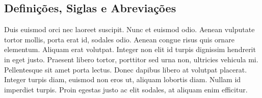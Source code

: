 \subsection{Definições, Siglas e Abreviações}
Duis euismod orci nec laoreet suscipit. Nunc et euismod odio. Aenean vulputate tortor mollis, porta erat id, sodales odio. Aenean congue risus quis ornare elementum. Aliquam erat volutpat. Integer non elit id turpis dignissim hendrerit in eget justo. Praesent libero tortor, porttitor sed urna non, ultricies vehicula mi. Pellentesque sit amet porta lectus. Donec dapibus libero at volutpat placerat. Integer turpis diam, euismod non eros ut, aliquam lobortis diam. Nullam id imperdiet turpis. Proin egestas justo ac elit sodales, at aliquam enim efficitur. \cite{da_cruz_marques_reserva_2014}